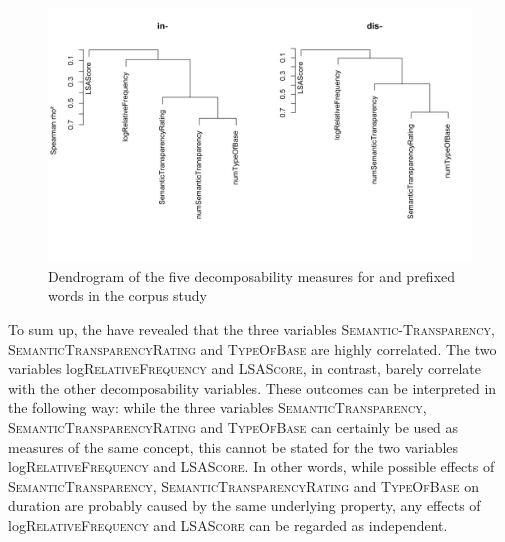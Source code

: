\begin{figure}  
	
	\includegraphics[scale=0.5]{images/Corpus/clusterAnalysisDecomposabilityCorpusDisAndIn.png}
	\caption{ Dendrogram of the five decomposability measures for  and prefixed words in the corpus study}
	\label{fig:cluster corpus dis and in}
\end{figure}



To sum up, the  have revealed that the three variables \textsc{Semantic-Transparency}, \textsc{SemanticTransparencyRating} and \textsc{TypeOfBase} are highly correlated. The two variables log\textsc{RelativeFrequency} and \textsc{LSAScore}, in contrast, barely correlate with the other decomposability variables.
These outcomes can be interpreted in the following way: while the three variables  \textsc{SemanticTransparency}, \textsc{SemanticTransparencyRating} and \textsc{TypeOfBase} can certainly be used as measures of the same concept, this cannot be stated for the two variables log\textsc{RelativeFrequency} and \textsc{LSAScore}. In other words,  while possible effects of \textsc{SemanticTransparency}, \textsc{SemanticTransparencyRating} and \textsc{TypeOfBase} on duration are probably caused by the same underlying property, any effects of log\textsc{RelativeFrequency} and \textsc{LSAScore} can be regarded as independent.


